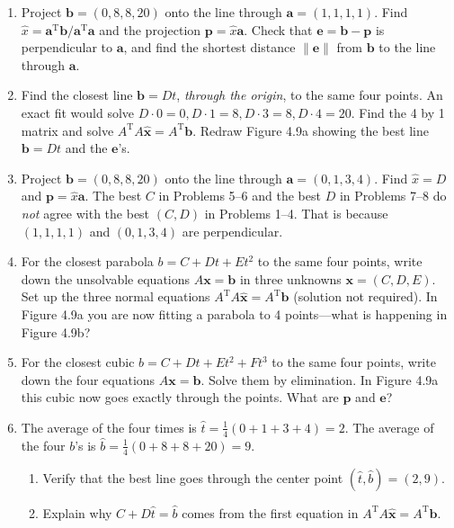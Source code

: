\documentclass[14pt, a4paper]{article}
\begin{document}
\begin{enumerate}
    \item Project $\boldsymbol{b} = (0, 8, 8, 20)$ onto the line through $\boldsymbol{a} = (1, 1, 1, 1)$. Find $\widehat{x} = \boldsymbol{a}^{\mathrm{T}}\boldsymbol{b}/\boldsymbol{a}^{\mathrm{T}}\boldsymbol{a}$ and the projection $\boldsymbol{p} = \widehat{x}\boldsymbol{a}$. Check that $\boldsymbol{e} = \boldsymbol{b} - \boldsymbol{p}$ is perpendicular to $\boldsymbol{a}$, and find the shortest distance $\|\boldsymbol{e}\|$ from $\boldsymbol{b}$ to the line through $\boldsymbol{a}$.

    \item Find the closest line $\boldsymbol{b} = Dt$, \emph{through the origin}, to the same four points. An exact fit would solve $D \cdot 0 = 0, D \cdot 1 = 8, D \cdot 3 = 8, D \cdot 4 = 20$. Find the 4 by 1 matrix and solve $A^{\mathrm{T}}A\widehat{\boldsymbol{x}} = A^{\mathrm{T}}\boldsymbol{b}$. Redraw Figure 4.9a showing the best line $\boldsymbol{b} = Dt$ and the $\boldsymbol{e}$'s.

    \item Project $\boldsymbol{b} = (0, 8, 8, 20)$ onto the line through $\boldsymbol{a} = (0, 1, 3, 4)$. Find $\widehat{x} = D$ and $\boldsymbol{p} = \widehat{x}\boldsymbol{a}$. The best $C$ in Problems 5--6 and the best $D$ in Problems 7--8 do \emph{not} agree with the best $(C, D)$ in Problems 1--4. That is because $(1, 1, 1, 1)$ and $(0, 1, 3, 4)$ are \underline{\hspace{2cm}} perpendicular.

    \item For the closest parabola $b = C + Dt + Et^2$ to the same four points, write down the unsolvable equations $A\boldsymbol{x} = \boldsymbol{b}$ in three unknowns $\boldsymbol{x} = (C, D, E)$. Set up the three normal equations $A^{\mathrm{T}}A\widehat{\boldsymbol{x}} = A^{\mathrm{T}}\boldsymbol{b}$ (solution not required). In Figure 4.9a you are now fitting a parabola to 4 points---what is happening in Figure 4.9b?

    \item For the closest cubic $b = C + Dt + Et^2 + Ft^3$ to the same four points, write down the four equations $A\boldsymbol{x} = \boldsymbol{b}$. Solve them by elimination. In Figure 4.9a this cubic now goes exactly through the points. What are $\boldsymbol{p}$ and $\boldsymbol{e}$?

    \item The average of the four times is $\widehat{t} = \frac{1}{4}(0 + 1 + 3 + 4) = 2$. The average of the four $b$'s is $\widehat{b} = \frac{1}{4}(0 + 8 + 8 + 20) = 9$.
          \begin{enumerate}
              \item Verify that the best line goes through the center point $(\widehat{t}, \widehat{b}) = (2, 9)$.
              \item Explain why $C + D\widehat{t} = \widehat{b}$ comes from the first equation in $A^{\mathrm{T}}A\widehat{\boldsymbol{x}} = A^{\mathrm{T}}\boldsymbol{b}$.
          \end{enumerate}
\end{enumerate}
\end{document}
